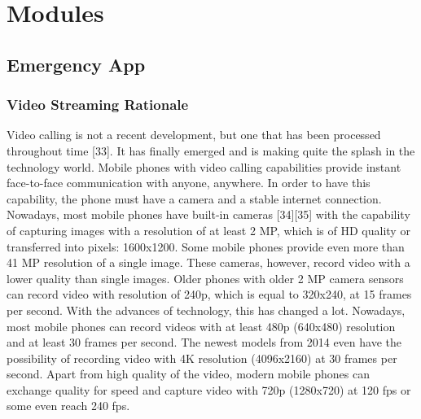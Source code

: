 \documentclass{article}
\begin{document}
\section{Modules}
    \subsection{Emergency App}
    	\subsubsection{Video Streaming Rationale}
    	Video calling is not a recent development, but one that has been processed throughout time [33]. It has finally emerged and is making quite the splash in the technology world. Mobile phones with video calling capabilities provide instant face-to-face communication with anyone, anywhere. In order to have this capability, the phone must have a camera and a stable internet connection.\\
    	
    	Nowadays, most mobile phones have built-in cameras [34][35] with the capability of capturing images with a resolution of at least 2 MP, which is of HD quality or transferred into pixels: 1600x1200. Some mobile phones provide even more than 41 MP resolution of a single image. These cameras, however, record video with a lower quality than single images. Older phones with older 2 MP camera sensors can record video with resolution of 240p, which is equal to 320x240, at 15 frames per second. With the advances of technology, this has changed a lot. Nowadays, most mobile phones can record videos with at least 480p (640x480) resolution and at least 30 frames per second. The newest models from 2014 even have the possibility of recording video with 4K resolution (4096x2160) at 30 frames per second. Apart from high quality of the video, modern mobile phones can exchange quality for speed and capture video with 720p (1280x720) at 120 fps or some even reach 240 fps.\\
    	
\end{document}
